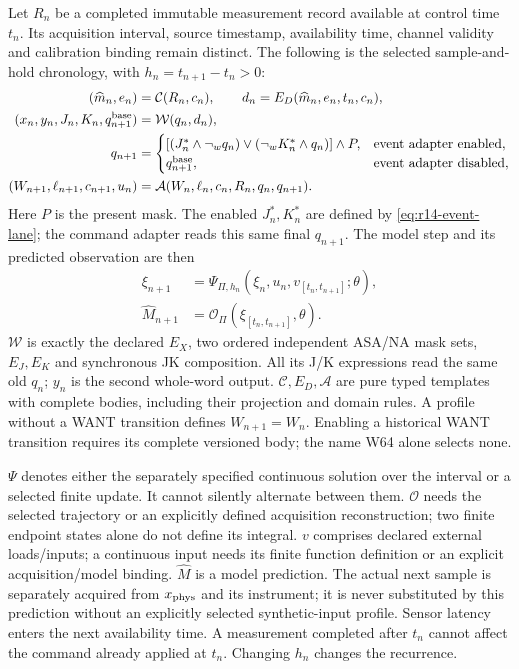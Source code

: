 Let $R_n$ be a completed immutable measurement record available at control time
$t_n$. Its acquisition interval, source timestamp, availability time, channel
validity and calibration binding remain distinct. The following is the selected
sample-and-hold chronology, with $h_n=t_{n+1}-t_n>0$:
\begin{align}
 (\widehat m_n,e_n)&=\mathcal C(R_n,c_n),\qquad
 d_n=E_D(\widehat m_n,e_n,t_n,c_n),\nonumber\\
 (x_n,y_n,J_n,K_n,q_{n+1}^{\rm base})&=\mathcal W(q_n,d_n),\nonumber\\
 q_{n+1}&=\begin{cases}
 [(J_n^*\land\neg_w q_n)\lor(\neg_w K_n^*\land q_n)]\land P,
     &\text{event adapter enabled},\\
 q_{n+1}^{\rm base},&\text{event adapter disabled},
 \end{cases}\nonumber\\
 (W_{n+1},\ell_{n+1},c_{n+1},u_n)
     &=\mathcal A(W_n,\ell_n,c_n,R_n,q_n,q_{n+1}).
 \label{eq:r14-word-schedule}
\end{align}
Here $P$ is the present mask. The enabled $J_n^*,K_n^*$ are defined by
\eqref{eq:r14-event-lane}; the command adapter reads this same final
$q_{n+1}$. The model step and its predicted observation are then
\begin{align}
 \xi_{n+1}&=\Psi_{\Pi,h_n}(\xi_n,u_n,v_{[t_n,t_{n+1}]};\theta),\nonumber\\
 \widehat M_{n+1}&=\mathcal O_\Pi(\xi_{[t_n,t_{n+1}]},\theta).
 \label{eq:r14-model-schedule}
\end{align}
$\mathcal W$ is exactly the declared $E_X$, two ordered independent ASA/NA mask
sets, $E_J,E_K$ and synchronous JK composition. All its J/K expressions read
the same old $q_n$; $y_n$ is the second whole-word output. $\mathcal C,E_D,
\mathcal A$ are pure typed templates with complete bodies, including their
projection and domain rules. A profile without a WANT transition defines
$W_{n+1}=W_n$. Enabling a historical WANT transition requires its complete
versioned body; the name W64 alone selects none.

$\Psi$ denotes either the separately specified continuous solution over the
interval or a selected finite update. It cannot silently alternate between them.
$\mathcal O$ needs the selected trajectory or an explicitly defined acquisition
reconstruction; two finite endpoint states alone do not define its integral.
$v$ comprises declared external loads/inputs; a continuous input needs its finite
function definition or an explicit acquisition/model binding. $\widehat M$ is
a model prediction. The actual next sample is separately acquired from
$x_{\rm phys}$ and its instrument; it is never substituted by this prediction
without an explicitly selected synthetic-input profile. Sensor latency enters
the next availability time. A measurement completed after $t_n$ cannot affect
the command already applied at $t_n$. Changing $h_n$ changes the recurrence.

